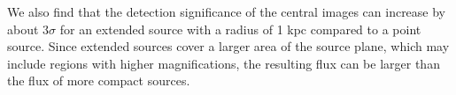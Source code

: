 \documentclass[chicago]{emulateapj}
\begin{document}
We also find that the detection significance of the central images can increase by about $3\sigma$ for an extended source with a radius of 1 kpc compared to a point source. Since extended sources cover a larger area of the source plane, which may include regions with higher magnifications, the resulting flux can be larger than the flux of more compact sources.
\end{document}
